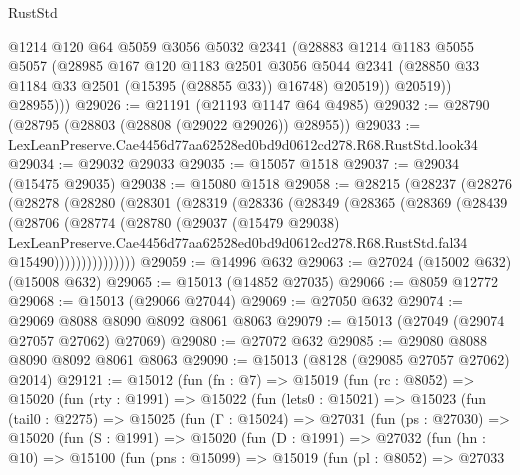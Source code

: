 \begin{lexlean}{RustStd}
\begin{coremodule}
              @1214
              @120
              @64
              @5059
              @3056
              @5032
              @2341
              (@28883
                @1214
                @1183
                @5055
                @5057
                (@28985
                  @167
                  @120
                  @1183
                  @2501
                  @3056
                  @5044
                  @2341
                  (@28850 @33 @1184 @33 @2501 (@15395 (@28855 @33)) @16748)
                  @20519))
              @20519))
          @28955)))
@29026 := @21191 (@21193 @1147 @64 @4985)
@29032 := @28790 (@28795 (@28803 (@28808 (@29022 @29026)) @28955))
@29033 := LexLeanPreserve.Cae4456d77aa62528ed0bd9d0612cd278.R68.RustStd.look34
@29034 := @29032 @29033
@29035 := @15057 @1518
@29037 := @29034 (@15475 @29035)
@29038 := @15080 @1518
@29058 := @28215
    (@28237
      (@28276
        (@28278
          (@28280
            (@28301
              (@28319
                (@28336
                  (@28349
                    (@28365
                      (@28369
                        (@28439
                          (@28706
                            (@28774
                              (@28780
                                (@29037
                                  (@15479 @29038)
                                  LexLeanPreserve.Cae4456d77aa62528ed0bd9d0612cd278.R68.RustStd.fal34
                                  @15490)))))))))))))))
@29059 := @14996 @632
@29063 := @27024 (@15002 @632) (@15008 @632)
@29065 := @15013 (@14852 @27035)
@29066 := @8059 @12772
@29068 := @15013 (@29066 @27044)
@29069 := @27050 @632
@29074 := @29069 @8088 @8090 @8092 @8061 @8063
@29079 := @15013 (@27049 (@29074 @27057 @27062) @27069)
@29080 := @27072 @632
@29085 := @29080 @8088 @8090 @8092 @8061 @8063
@29090 := @15013 (@8128 (@29085 @27057 @27062) @2014)
@29121 := @15012
    (fun (fn : @7) =>
    @15019
      (fun (rc : @8052) =>
      @15020
        (fun (rty : @1991) =>
        @15022
          (fun (lets0 : @15021) =>
          @15023
            (fun (tail0 : @2275) =>
            @15025
              (fun (Γ : @15024) =>
              @27031
                (fun (ps : @27030) =>
                @15020
                  (fun (S : @1991) =>
                  @15020
                    (fun (D : @1991) =>
                    @27032
                      (fun (hn : @10) =>
                      @15100
                        (fun (pns : @15099) =>
                        @15019
                          (fun (pl : @8052) =>
                          @27033

\end{coremodule}
\end{lexlean}
